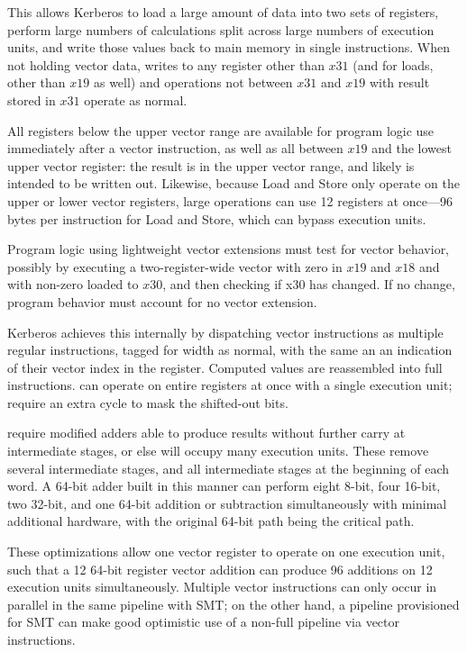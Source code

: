 This allows Kerberos to load a large amount of data into two sets of registers,
perform large numbers of calculations split across large numbers of execution
units, and write those values back to main memory in single instructions.  When
not holding vector data, writes to any register other than $x31$ (and for loads,
other than $x19$ as well) and operations not between $x31$ and $x19$ with
result stored in $x31$ operate as normal.

All registers below the upper vector range are available for program logic use
immediately after a vector instruction, as well as all between $x19$ and the
lowest upper vector register:  the result is in the upper vector range, and likely
is intended to be written out.  Likewise, because Load and Store only operate
on the upper or lower vector registers, large  operations can
use 12 registers at once—96 bytes per instruction for Load and Store, which can
bypass execution units.

Program logic using lightweight vector extensions must test for vector behavior,
possibly by executing a two-register-wide vector  with zero in
$x19$ and $x18$ and with non-zero loaded to $x30$, and then checking if x30 has
changed.  If no change, program behavior must account for no vector extension.

Kerberos achieves this internally by dispatching vector instructions as multiple
regular instructions, tagged for width as normal, with the same 
an an indication of their vector index in the register.  Computed values are
reassembled into full instructions.   can operate on
entire registers at once with a single execution unit;  require an extra cycle to mask the shifted-out bits.

 require modified adders able to produce results without
further carry at intermediate stages, or else will occupy many execution units.
These remove several intermediate stages, and all intermediate stages at the
beginning of each word.  A 64-bit adder built in this manner can perform eight
8-bit, four 16-bit, two 32-bit, and one 64-bit addition or subtraction
simultaneously with minimal additional hardware, with the original 64-bit path
being the critical path.

These optimizations allow one vector register to operate on one execution unit,
such that a 12 64-bit register vector addition can produce 96 additions on 12
execution units simultaneously.  Multiple vector instructions can only occur in
parallel in the same pipeline with SMT; on the other hand, a pipeline
provisioned for SMT can make good optimistic use of a non-full pipeline via
vector instructions.

